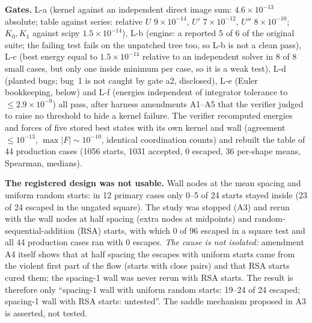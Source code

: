 \documentclass[11pt,a4paper]{article}
\begin{document}
\textbf{Gates.} L-a (kernel against an independent direct image sum: $4.6\times10^{-13}$ absolute; table against series: relative
$U$ $9\times10^{-14}$, $U'$ $7\times10^{-12}$, $U''$ $8\times10^{-10}$; $K_0,K_1$ against scipy $1.5\times10^{-14}$), L-b (engine: a reported 5 of 6 of the original
suite; the failing test fails on the unpatched tree too, so L-b is not a clean pass), L-c (best energy equal to $1.5\times10^{-14}$ relative to an independent solver in 8 of 8 small cases, but
only one inside minimum per case, so it is a weak test), L-d (planted bugs; bug~1 is not caught by gate a2, disclosed), L-e (Euler bookkeeping,
below) and L-f (energies independent of integrator tolerance to $\le2.9\times10^{-9}$) all pass, after harness amendments A1--A5 that
the verifier judged to raise no threshold to hide a kernel failure. The verifier recomputed energies and forces of five stored best states
with its own kernel and wall (agreement $\le10^{-13}$, $\max|F|\sim10^{-10}$, identical coordination counts) and rebuilt the table of
44 production cases (1056 starts, 1031 accepted, 0 escaped, 36 per-shape means, Spearman, medians).

\begin{failbox}
\textbf{The registered design was not usable.} Wall nodes at the mean spacing and uniform random starts: in 12 primary cases only 0--5
of 24 starts stayed inside (23 of 24 escaped in the ungated square). The study was stopped (A3) and rerun with the wall nodes at half
spacing (extra nodes at midpoints) and random-sequential-addition (RSA) starts, with which 0 of 96 escaped in a square test and all 44
production cases ran with 0 escapes. \emph{The cause is not isolated:} amendment A4 itself shows that at half spacing the escapes with uniform starts came from the violent first
part of the flow (starts with close pairs) and that RSA starts cured them; the spacing-1 wall was never rerun with RSA starts. The result is
therefore only ``spacing-1 wall with uniform random starts: 19--24 of 24 escaped; spacing-1 wall with RSA starts: untested''. The saddle
mechanism proposed in A3 is asserted, not tested.
\end{failbox}

\end{document}
